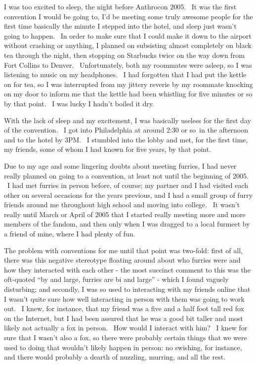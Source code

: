 I was too excited to sleep, the night before Anthrocon 2005. ~It was the
first convention I would be going to, I'd be meeting some truly awesome
people for the first time basically the minute I stepped into the hotel,
and sleep just wasn't going to happen. ~In order to make sure that I
could make it down to the airport without crashing or anything, I
planned on subsisting almost completely on black tea through the night,
then stopping on Starbucks twice on the way down from Fort Collins to
Denver. ~Unfortunately, both my roommates were asleep, so I was
listening to music on my headphones. ~I had forgotten that I had put the
kettle on for tea, so I was interrupted from my jittery reverie by my
roommate knocking on my door to inform me that the kettle had been
whistling for five minutes or so by that point. ~I was lucky I hadn't
boiled it dry.

With the lack of sleep and my excitement, I was basically useless for
the first day of the convention. ~I got into Philadelphia at around 2:30
or so~in the afternoon and to the hotel by 3PM. ~I stumbled into the
lobby and met, for the first time, my friends, some of whom I had known
for five years, by that point.

Due to my age and some lingering doubts about meeting furries, I had
never really planned on going to a convention, at least not until the
beginning of 2005. ~I had met furries in person before, of course; my
partner and I had visited each other on several occasions for the years
previous, and I had a small group of furry friends around me throughout
high school and moving into college. ~It wasn't really until March or
April of 2005 that I started really meeting more and more members of the
fandom, and then only when I was dragged to a local furmeet by a friend
of mine, where I had plenty of fun.

The problem with conventions for me until that point was two-fold: first
of all, there was this negative stereotype floating around about who
furries were and how they interacted with each other - the most succinct
comment to this was the oft-quoted ``by and large, furries are bi and
large'' - which I found vaguely disturbing; and secondly, I was so used
to interacting with my friends online that I wasn't quite sure how well
interacting in person with them was going to work out. ~I knew, for
instance, that my friend was a five and a half foot tall red fox on the
Internet, but I had been assured that he was a good bit taller and most
likely not actually a fox in person. ~How would I interact with him? ~I
knew for sure that I wasn't also a fox, so there were probably certain
things that we were used to doing that wouldn't likely happen in person:
no swishing, for instance, and there would probably a dearth of
nuzzling, murring, and all the rest.

